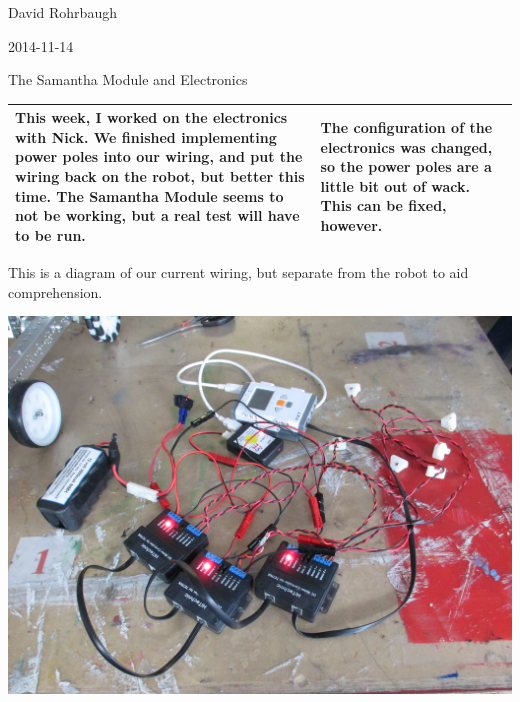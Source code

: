 David Rohrbaugh

2014-11-14

The Samantha Module and Electronics

\begin{tabular}{|p{5cm}|p{5cm}|}
 \hline
 This week, I worked on the electronics with Nick. We finished implementing power poles into our wiring, and put the wiring back on the robot, but better this time. The Samantha Module seems to not be working, but a real test will have to be run.
 &
 The configuration of the electronics was changed, so the power poles are a little bit out of wack. This can be fixed, however.
 \\
 \hline
\end{tabular}

\medskip

This is a diagram of our current wiring, but separate from the robot to aid comprehension.

\begin{center}
 \includegraphics[width=\textwidth]{./Entries/Images/wiring1.jpg}
\end{center}
